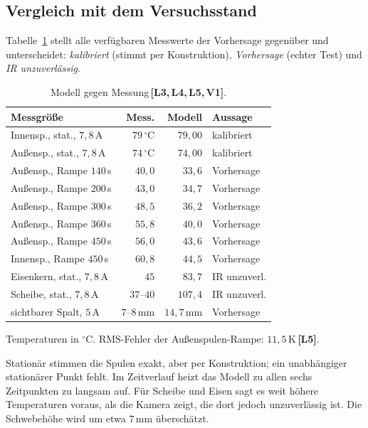 \documentclass[a4paper, 10pt, conference]{ieeeconf}
\theoremstyle{remark}
\newcommand{\src}[1]{\,\textbf{[#1]}}
\begin{document}
\subsection{Vergleich mit dem Versuchsstand}

Tabelle~\ref{tab:compare} stellt alle verfügbaren Messwerte der Vorhersage
gegenüber und unterscheidet: \emph{kalibriert} (stimmt per Konstruktion),
\emph{Vorhersage} (echter Test) und \emph{IR unzuverlässig}.

\begin{table}[t]
\centering\footnotesize
\caption{Modell gegen Messung\src{L3,\,L4,\,L5,\,V1}.}
\label{tab:compare}
\begin{tabular}{@{}lrrl@{}}
\toprule
Messgröße & Mess. & Modell & Aussage \\
\midrule
Innensp., stat., $7{,}8\,$A & $79\,^\circ$C & $79{,}00$ & kalibriert \\
Außensp., stat., $7{,}8\,$A & $74\,^\circ$C & $74{,}00$ & kalibriert \\
Außensp., Rampe $140\,$s & $40{,}0$ & $33{,}6$ & Vorhersage \\
Außensp., Rampe $200\,$s & $43{,}0$ & $34{,}7$ & Vorhersage \\
Außensp., Rampe $300\,$s & $48{,}5$ & $36{,}2$ & Vorhersage \\
Außensp., Rampe $360\,$s & $55{,}8$ & $40{,}0$ & Vorhersage \\
Außensp., Rampe $450\,$s & $56{,}0$ & $43{,}6$ & Vorhersage \\
Innensp., Rampe $450\,$s & $60{,}8$ & $44{,}5$ & Vorhersage \\
Eisenkern, stat., $7{,}8\,$A & $45$ & $83{,}7$ & IR unzuverl. \\
Scheibe, stat., $7{,}8\,$A & $37$--$40$ & $107{,}4$ & IR unzuverl. \\
sichtbarer Spalt, $5\,$A & $7$--$8\,$mm & $14{,}7\,$mm & Vorhersage \\
\bottomrule
\end{tabular}

\vspace{2pt}
{\footnotesize Temperaturen in $^\circ$C. RMS-Fehler der Außenspulen-Rampe: $11{,}5\,$K\src{L5}.}
\end{table}

Stationär stimmen die Spulen exakt, aber per Konstruktion; ein
unabhängiger stationärer Punkt fehlt. Im Zeitverlauf heizt das Modell zu
allen sechs Zeitpunkten zu langsam auf. Für Scheibe und Eisen sagt es weit
höhere Temperaturen voraus, als die Kamera zeigt, die dort jedoch
unzuverlässig ist. Die Schwebehöhe wird um etwa $7\,$mm überschätzt.
\end{document}
